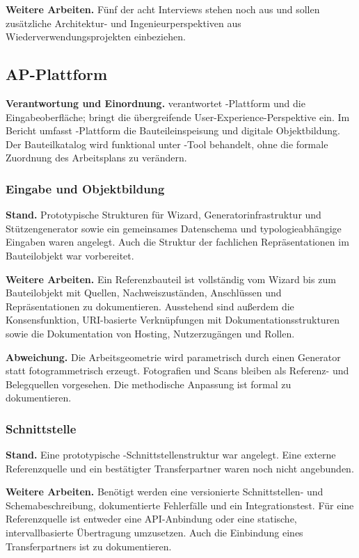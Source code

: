 \documentclass[type=zwischenbericht]{zukunftbau}
\begin{document}
\textbf{Weitere Arbeiten.} Fünf der acht Interviews stehen noch aus und sollen zusätzliche Architektur- und Ingenieurperspektiven aus Wiederverwendungsprojekten einbeziehen.

\subsection{AP-Plattform}

\textbf{Verantwortung und Einordnung.}  verantwortet -Plattform und die Eingabeoberfläche;  bringt die übergreifende User-Experience-Perspektive ein. Im Bericht umfasst -Plattform die Bauteileinspeisung und digitale Objektbildung. Der Bauteilkatalog wird funktional unter -Tool behandelt, ohne die formale Zuordnung des Arbeitsplans zu verändern.

\subsubsection{Eingabe und Objektbildung}

\textbf{Stand.} Prototypische Strukturen für Wizard, Generatorinfrastruktur und Stützengenerator sowie ein gemeinsames Datenschema und typologieabhängige Eingaben waren angelegt. Auch die Struktur der fachlichen Repräsentationen im Bauteilobjekt war vorbereitet.

\textbf{Weitere Arbeiten.} Ein Referenzbauteil ist vollständig vom Wizard bis zum Bauteilobjekt mit Quellen, Nachweiszuständen, Anschlüssen und Repräsentationen zu dokumentieren. Ausstehend sind außerdem die Konsensfunktion, URI-basierte Verknüpfungen mit Dokumentationsstrukturen sowie die Dokumentation von Hosting, Nutzerzugängen und Rollen.

\textbf{Abweichung.} Die Arbeitsgeometrie wird parametrisch durch einen Generator statt fotogrammetrisch erzeugt. Fotografien und Scans bleiben als Referenz- und Belegquellen vorgesehen. Die methodische Anpassung ist formal zu dokumentieren.

\subsubsection{Schnittstelle}

\textbf{Stand.} Eine prototypische -Schnittstellenstruktur war angelegt. Eine externe Referenzquelle und ein bestätigter Transferpartner waren noch nicht angebunden.

\textbf{Weitere Arbeiten.} Benötigt werden eine versionierte Schnittstellen- und Schemabeschreibung, dokumentierte Fehlerfälle und ein Integrationstest. Für eine Referenzquelle ist entweder eine API-Anbindung oder eine statische, intervallbasierte Übertragung umzusetzen. Auch die Einbindung eines Transferpartners ist zu dokumentieren.
\end{document}
